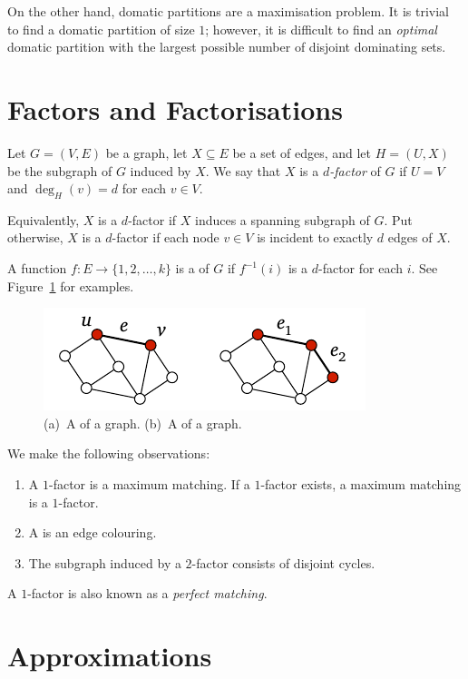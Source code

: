 On the other hand, domatic partitions are a maximisation problem. It is trivial to find a domatic partition of size $1$; however, it is difficult to find an \emph{optimal} domatic partition with the largest possible number of disjoint dominating sets.


\section{Factors and Factorisations}

Let $G = (V,E)$ be a graph, let $X \subseteq E$ be a set of edges, and let $H = (U,X)$ be the subgraph of $G$ induced by $X$. We say that $X$ is a \emph{$d$-factor} of $G$ if $U = V$ and $\deg_H(v) = d$ for each $v \in V$.

Equivalently, $X$ is a $d$-factor if $X$ induces a spanning  subgraph of $G$. Put otherwise, $X$ is a $d$-factor if each node $v \in V$ is incident to exactly $d$ edges of $X$.

A function $f\colon E \to \{1,2,\dotsc,k\}$ is a \emph{} of $G$ if $f^{-1}(i)$ is a $d$-factor for each $i$. See Figure~\ref{fig:factorisation} for examples.
\begin{figure}
    \centering
    \includegraphics[page=\PFactorisation]{figs.pdf}
    \caption{
        (a)~A  of a  graph.
        (b)~A  of a  graph.
    }\label{fig:factorisation}
\end{figure}

We make the following observations:
\begin{enumerate}
    \item A $1$-factor is a maximum matching. If a $1$-factor exists, a maximum matching is a $1$-factor.
    \item A  is an edge colouring.
    \item The subgraph induced by a $2$-factor consists of disjoint cycles.
\end{enumerate}
A $1$-factor is also known as a \emph{perfect matching}.


\section{Approximations}

